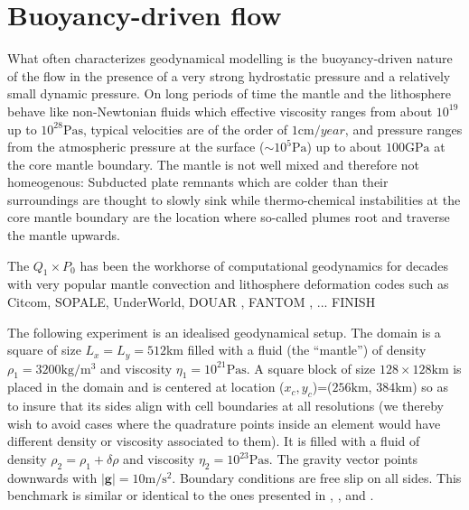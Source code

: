 \documentclass[a4paper]{article}
\begin{document}
\section{Buoyancy-driven flow}





What often characterizes geodynamical modelling is the buoyancy-driven nature of the flow 
in the presence of a very strong hydrostatic pressure and a relatively small dynamic pressure.
On long periods of time the mantle and the lithosphere behave like non-Newtonian fluids
which effective viscosity ranges from about $10^{19}$ up to $10^{28}\si{\pascal\second}$, 
typical velocities are of the order of $1\si{\cm\per year}$, and pressure ranges from 
the atmospheric pressure at the surface ($\sim 10^5 \si{\pascal}$) up to about $100\si{\giga\pascal}$ 
at the core mantle boundary. The mantle is not well mixed and therefore not homeogenous: 
Subducted plate remnants which are colder than their surroundings are thought to slowly sink 
while thermo-chemical instabilities at the core mantle boundary are the location where 
so-called plumes root and traverse the mantle upwards.

The $Q_1\times P_0$ has been the workhorse of computational geodynamics for decades with 
very popular mantle convection and lithosphere deformation codes such as Citcom, SOPALE, 
UnderWorld, DOUAR \cite{brtf08}, FANTOM \cite{thie11}, ... FINISH



The following experiment is an idealised geodynamical setup.
The domain is a square of size $L_x=L_y=512$km filled with a fluid (the ``mantle'')
of density $\rho_1=3200\si{\kg\per\cubic\metre}$ 
and viscosity $\eta_1=10^{21}\si{\pascal\second}$.
A square block of size $128\times 128\si{\km}$ is placed in the domain and
is centered at location ($x_c,y_c$)=($256\si{\km}$, $384\si{\km}$) so 
as to insure that its sides
align with cell boundaries at all resolutions (we thereby wish to avoid
cases where the quadrature points inside an element would have different
density or viscosity associated to them). It is filled with a fluid
of density $\rho_2=\rho_1+\delta \rho$ and viscosity $\eta_2=10^{23}\si{\pascal\second}$.
The gravity vector points downwards with $|{\bm g}|=10\si{\metre\per\square\second}$. 
Boundary conditions are free slip on all sides.
This benchmark is similar or identical to the ones presented in 
\cite{mamo08}, \cite{gery10}, \cite{thie11} and \cite{sctc20}.
\end{document}
